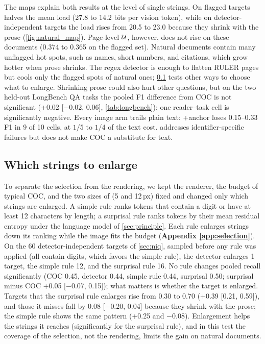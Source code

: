 The maps explain both results at the level of single strings.
On flagged targets \name halves the mean load (27.8 to 14.2 bits per vision token), while on detector-independent targets the load rises from 20.5 to 23.0 because they shrink with the prose (\cref{fig:natural_map}).
Page-level $\mathcal{U}$, however, does not rise on these documents (0.374 to 0.365 on the flagged set).
Natural documents contain many unflagged hot spots, such as names, short numbers, and citations, which grow hotter when prose shrinks.
The regex detector is enough to flatten RULER pages but cools only the flagged spots of natural ones; \cref{sec:selection} tests other ways to choose what to enlarge.
Shrinking prose could also hurt other questions, but on the two held-out LongBench QA tasks the pooled F1 difference from COC is not significant (+0.02 [$-$0.02, 0.06], \cref{tab:longbench}); one reader--task cell is significantly negative.
Every image arm trails plain text: \name+anchor loses 0.15--0.33 F1 in 9 of 10 cells, at $1/5$ to $1/4$ of the text cost.  
\name addresses identifier-specific failures but does not make COC a substitute for text.

\subsection{Which strings to enlarge}
\label{sec:selection}

To separate the selection from the rendering, we kept the renderer, the budget of typical COC, and the two sizes of \name (5 and 12\,px) fixed and changed only which strings are enlarged.
A simple rule ranks tokens that contain a digit or have at least 12 characters by length; a surprisal rule ranks tokens by their mean residual entropy under the language model of \cref{sec:principle}.
Each rule enlarges strings down its ranking while the image fits the budget (\textbf{Appendix \ref{app:selection}}).
On the 60 detector-independent targets of \cref{sec:niq}, sampled before any rule was applied (all contain digits, which favors the simple rule), the detector enlarges 1 target, the simple rule 12, and the surprisal rule 16.
No rule changes pooled recall significantly (COC 0.45, detector 0.44, simple rule 0.44, surprisal 0.50; surprisal minus COC +0.05 [$-$0.07, 0.15]); what matters is whether the target is enlarged.
Targets that the surprisal rule enlarges rise from 0.30 to 0.70 (+0.39 [0.21, 0.59]), and those it misses fall by 0.08 [$-$0.20, 0.04] because they shrink with the prose; the simple rule shows the same pattern (+0.25 and $-$0.08).
Enlargement helps the strings it reaches (significantly for the surprisal rule), and in this test the coverage of the selection, not the rendering, limits the gain on natural documents.

